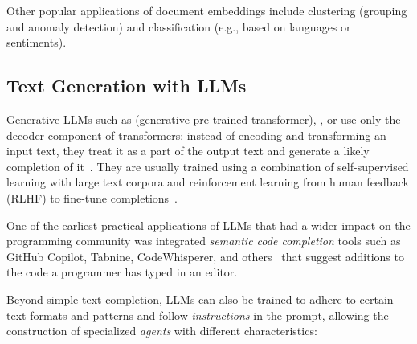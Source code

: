 Other popular applications of document embeddings include clustering (grouping and anomaly detection) and classification (e.g., based on languages or sentiments).

\subsection{Text Generation with LLMs}
\label{sec:background/semtec/generation}

Generative LLMs such as  (generative pre-trained transformer), , or  use only the decoder component of transformers:
instead of encoding and transforming an input text, they treat it as a part of the output text and generate a likely completion of it~\cite{radford2018improving,openai2024gpt4}.
They are usually trained using a combination of self-supervised learning with large text corpora and reinforcement learning from human feedback (RLHF) to fine-tune completions~\cite{ouyang2022training}.

One of the earliest practical applications of LLMs that had a wider impact on the programming community was integrated \emph{semantic code completion} tools such as GitHub Copilot, Tabnine, CodeWhisperer, and others~\cite{chen2021evaluating,barka2023grounded} that suggest additions to the code a programmer has typed in an editor.

Beyond simple text completion, LLMs can also be trained to adhere to certain text formats and patterns and follow \emph{instructions} in the prompt, allowing the construction of specialized \emph{agents} with different characteristics:


